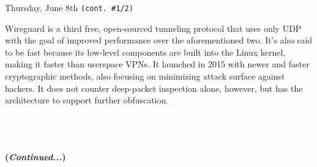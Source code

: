 \documentclass[11pt]{article}
\begin{document}
\begin{orangebox}{Thursday, June 8th \hspace{0.2cm}\texttt{(cont. \#1/2)}\vspace{-2.2em}\begin{flushright}\end{flushright}}
\begin{itemize}
        \phantom{~~~~} Wireguard is a third free, open-sourced tunneling protocol that uses only UDP with the goal of improved performance over the aforementioned two. It's also said to be fast because its low-level components are built into the Linux kernel, making it faster than userspace VPNs. It launched in 2015 with newer and faster cryptographic methods, also focusing on minimizing attack surface against hackers. It does not counter deep-packet inspection alone, however, but has the architecture to support further obfuscation.
    \end{itemize}
    \begin{center}
        \vspace{-0.5em}
        \large\bullet \\
        \large\bullet \\
        \large\bullet \\
        \Large\textbf{(\textit{Continued...})}
    \end{center}
\end{orangebox}
\end{document}
